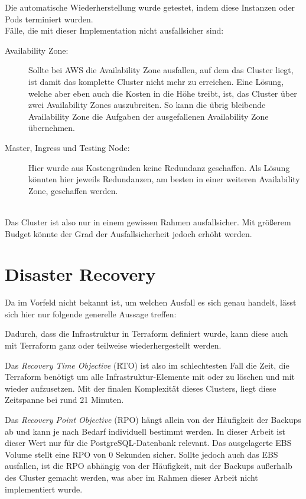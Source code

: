 Die automatische Wiederherstellung wurde getestet, indem diese Instanzen
oder Pods terminiert wurden.
\hfill
\\
Fälle, die mit dieser Implementation nicht ausfallsicher sind:

\begin{description}
  \item[Availability Zone:]
  Sollte bei AWS die Availability Zone ausfallen, auf dem das Cluster liegt,
  ist damit das komplette Cluster nicht mehr zu erreichen. Eine Lösung, welche
  aber eben auch die Kosten in die Höhe treibt, ist, das Cluster über zwei
  Availability Zones auszubreiten. So kann die übrig bleibende Availability Zone
  die Aufgaben der ausgefallenen Availability Zone übernehmen.
  \item[Master, Ingress und Testing Node:]
  Hier wurde aus Kostengründen keine Redundanz geschaffen.
  Als Lösung könnten hier jeweils Redundanzen, am besten in
  einer weiteren Availability Zone, geschaffen werden.
\end{description}
\hfill
\\
Das Cluster ist also nur in einem gewissen Rahmen ausfallsicher. Mit
größerem Budget könnte der Grad der Ausfallsicherheit jedoch erhöht werden.

\section{Disaster Recovery}

Da im Vorfeld nicht bekannt ist, um welchen Ausfall es sich genau handelt,
lässt sich hier nur folgende generelle Aussage treffen:

Dadurch, dass die Infrastruktur in Terraform definiert wurde, kann diese
auch mit Terraform ganz oder teilweise
wiederhergestellt werden.

Das \emph{Recovery Time Objective} (RTO) \cite{wood2010disaster} ist also
im schlechtesten Fall
die Zeit, die Terraform benötigt um alle Infrastruktur-Elemente
mit  oder  zu löschen
und mit  wieder aufzusetzen.
Mit der finalen Komplexit\"at dieses Clusters, liegt diese Zeitspanne bei
rund 21 Minuten.

Das \emph{Recovery Point Objective} (RPO) \cite{wood2010disaster} hängt allein von der Häufigkeit der
Backups ab und kann je nach Bedarf individuell bestimmt werden. In dieser Arbeit
ist dieser Wert nur für die PostgreSQL-Datenbank relevant.
Das ausgelagerte EBS Volume stellt eine RPO von 0 Sekunden sicher. Sollte jedoch
auch das EBS ausfallen, ist die RPO abhängig von der Häufigkeit, mit der
Backups außerhalb des Cluster gemacht werden, was aber im Rahmen
dieser Arbeit nicht implementiert wurde.

